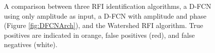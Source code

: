 \documentclass[a0,landscape]{a0poster}
\begin{document}
\begin{multicols}{4}
\begin{figure}[H]
\centering
{}
\caption{A comparison between three RFI identification algorithms, a D-FCN using only amplitude as input, a D-FCN with amplitude and phase (Figure \ref{fig:DFCNArch}), and the Watershed RFI algorithm. True positives are indicated in orange, false positives (red), and false negatives (white).}
\label{fig:DFCNCompare}
\end{figure}



\end{multicols}
\end{document}
